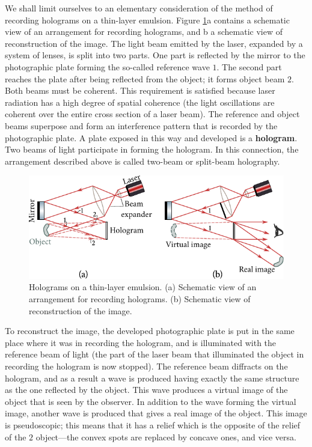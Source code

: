 We shall limit ourselves to an elementary consideration of the method of recording holograms on a thin-layer emulsion.
Figure \ref{fig:18_49}a contains a schematic view of an arrangement for recording holograms,
and b a schematic view of reconstruction of the image.
The light beam emitted by the laser, expanded by a system of lenses, is split into two parts.
One part is reflected by the mirror to the photographic plate forming the so-called reference wave $1$.
The second part reaches the plate after being reflected from the object; it forms object beam $2$.
Both beams must be coherent.
This requirement is satisfied because laser radiation has a high degree of spatial coherence (the light oscillations are coherent over the entire cross section of a laser beam).
The reference and object beams superpose and form an interference pattern that is recorded by the photographic plate.
A plate exposed in this way and developed is a \textbf{hologram}.
Two beams of light participate in forming the hologram.
In this connection, the arrangement described above is called two-beam or split-beam holography.

\begin{figure}[!htb]
	\begin{center}
		\includegraphics[scale=1]{figures/ch_18/fig_18_49.pdf}
        \caption[]{Holograms on a thin-layer emulsion. (a) Schematic view of an arrangement for recording holograms. (b) Schematic view of reconstruction of the image.}
		\label{fig:18_49}
	\end{center}
	\vspace{-0.8cm}
\end{figure}

To reconstruct the image, the developed photographic plate is put in the same place where it was in recording the hologram, and is illuminated with the reference beam of light (the part of the laser beam that illuminated the object in recording the hologram is now stopped).
The reference beam diffracts on the hologram, and as a result a wave is produced having exactly the same structure as the one reflected by the object.
This wave produces a virtual image of the object that is seen by the observer.
In addition to the wave forming the virtual image, another wave is produced that gives a real
image of the object.
This image is pseudoscopic; this means that it has a relief which is the opposite of the relief of the $2$ object---the convex spots are replaced by concave ones, and vice versa.

